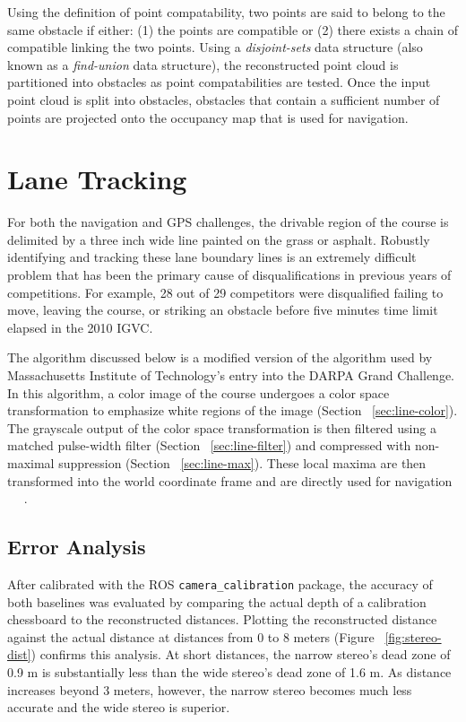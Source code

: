 \documentclass[twocolumn,11pt]{article}
\begin{document}
Using the definition of point compatability, two points are said to belong to
the same obstacle if either: (1) the points are compatible or (2) there exists
a chain of compatible linking the two points. Using a \textit{disjoint-sets}
data structure (also known as a \textit{find-union} data structure), the
reconstructed point cloud is partitioned into obstacles as point
compatabilities are tested. Once the input point cloud is split into obstacles,
obstacles that contain a sufficient number of points are projected onto the
occupancy map that is used for navigation.

\section{Lane Tracking}
\label{sec:line}
For both the navigation and GPS challenges, the drivable region of the course
is delimited by a three inch wide line painted on the grass or asphalt.
Robustly identifying and tracking these lane boundary lines is an extremely
difficult problem that has been the primary cause of disqualifications in
previous years of competitions. For example, 28 out of 29 competitors were
disqualified failing to move, leaving the course, or striking an obstacle
before five minutes time limit elapsed in the 2010 IGVC.

The algorithm discussed below is a modified version of the algorithm used by
Massachusetts Institute of Technology's entry into the DARPA Grand Challenge.
In this algorithm, a color image of the course undergoes a color space
transformation to emphasize white regions of the image (Section
~\ref{sec:line-color}). The grayscale output of the color space transformation
is then filtered using a matched pulse-width filter (Section
~\ref{sec:line-filter}) and compressed with non-maximal suppression (Section
~\ref{sec:line-max}). These local maxima are then transformed into the world
coordinate frame and are directly used for navigation ~\cite{huang_thesis}
~\cite{huang_paper}.

\subsection{Error Analysis}
\label{sec:stereo-error}
After calibrated with the ROS \texttt{camera\_calibration} package, the
accuracy of both baselines was evaluated by comparing the actual depth of a
calibration chessboard to the reconstructed distances. Plotting the
reconstructed distance against the actual distance at distances from 0 to 8
meters (Figure ~\ref{fig:stereo-dist}) confirms this analysis. At short
distances, the narrow stereo's dead zone of 0.9 m is substantially less than
the wide stereo's dead zone of 1.6 m. As distance increases beyond 3 meters,
however, the narrow stereo becomes much less accurate and the wide stereo is
superior.
\end{document}
